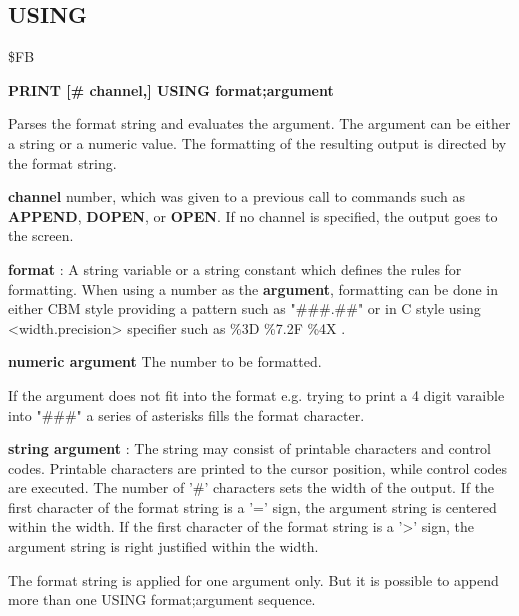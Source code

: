 \subsection{USING}
\begin{description}[leftmargin=2cm,style=nextline]
\item [Token:] \$FB
\item [Format:] {\bf PRINT [\# channel,] USING format;argument}
\item [Usage:]  Parses the format string and evaluates the argument.
                The argument can be either a string or a numeric value.
                The formatting of the resulting output is directed
                by the format string.

                {\bf channel} number, which was given to a previous
                call to commands such as {\bf APPEND}, {\bf DOPEN}, or {\bf OPEN}.
                If no channel is specified, the output goes to the screen.

                {\bf format} : A string variable or a string constant
                which defines the rules for formatting.
                When using a number as the {\bf argument}, formatting can be done in either
                CBM style providing a pattern such as
                    {\ttfamily "\#\#\#.\#\#"}
                or in C style using <width.precision> specifier such as
                    {\ttfamily \%3D \%7.2F \%4X }.

                {\bf numeric argument} The number to be formatted.

                If the argument does not fit into the format
                e.g. trying to print a 4 digit varaible into "\#\#\#"
                a series of asterisks fills the format character.

                {\bf string argument} : The string may consist of printable
                characters and control codes. Printable characters
                are printed to the cursor position, while control
                codes are executed.
                The number of '\#' characters sets the width of the output.
                If the first character of the format string
                is a '=' sign, the argument string is centered within
                the width.
                If the first character of the format string
                is a '>' sign, the argument string is right justified within
                the width.

\item [Remarks:] The format string is applied for one argument only.
                 But it is possible to append more than one
                 USING format;argument sequence.



\end{description}

